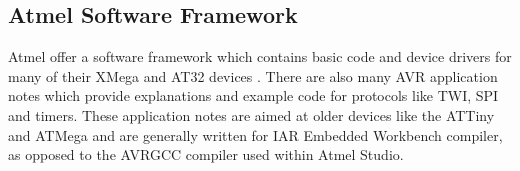 \subsection{Atmel Software Framework}

Atmel offer a software framework which contains basic code and device drivers for many of their XMega and AT32 devices \citep{Atmel:ASF}. There are also many AVR application notes which provide explanations and example code for protocols like TWI, SPI and timers. These application notes are aimed at older devices like the ATTiny and ATMega and are generally written for IAR Embedded Workbench compiler, as opposed to the AVRGCC compiler used within Atmel Studio. 

%
%
%
%
%


